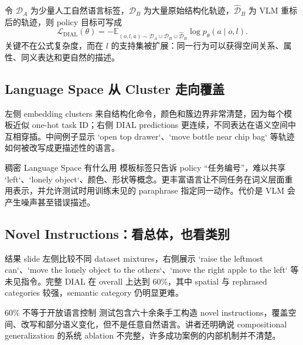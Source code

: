令 $\mathcal{D}_A$ 为少量人工自然语言标签，$\mathcal{D}_B$ 为大量原始结构化轨迹，$\hat{\mathcal{D}}_B$ 为 VLM 重标后的轨迹，则 policy 目标可写成
\begin{equation}
\mathcal{L}_{\mathrm{DIAL}}(\theta)
=-\mathbb{E}_{(o,l,a)\sim
\mathcal{D}_A\cup\mathcal{D}_B\cup\hat{\mathcal{D}}_B}
\log p_{\theta}(a\mid o,l).
\end{equation}
关键不在公式复杂度，而在 $l$ 的支持集被扩展：同一行为可以获得空间关系、属性、同义表达和更自然的描述。

\subsection{Language Space 从 Cluster 走向覆盖}

左侧 embedding clusters 来自结构化命令，颜色和簇边界非常清楚，因为每个模板近似 one-hot task ID；右侧 DIAL predictions 更连续，不同表达在语义空间中互相穿插。中间例子显示 `open top drawer`、`move bottle near chip bag` 等轨迹如何被改写成更描述性的语言。


\begin{knowledgebox}{稠密 Language Space 有什么用}
模板标签只告诉 policy “任务编号”，难以共享 `left`、`lonely object`、颜色、形状等概念。更丰富语言让不同任务在词义层面重用表示，并允许测试时用训练未见的 paraphrase 指定同一动作。代价是 VLM 会产生噪声甚至错误描述。
\end{knowledgebox}

\subsection{Novel Instructions：看总体，也看类别}

结果 slide 左侧比较不同 dataset mixtures，右侧展示 `raise the leftmost can`、`move the lonely object to the others`、`move the right apple to the left` 等未见指令。完整 DIAL 在 overall 上达到 60\%，其中 spatial 与 rephrased categories 较强，semantic category 仍明显更难。


\begin{warningbox}{60\% 不等于开放语言控制}
测试包含六十余条手工构造 novel instructions，覆盖空间、改写和部分语义变化，但不是任意自然语言。讲者还明确说 compositional generalization 的系统 ablation 不完整，许多成功案例的内部机制并不清楚。
\end{warningbox}

